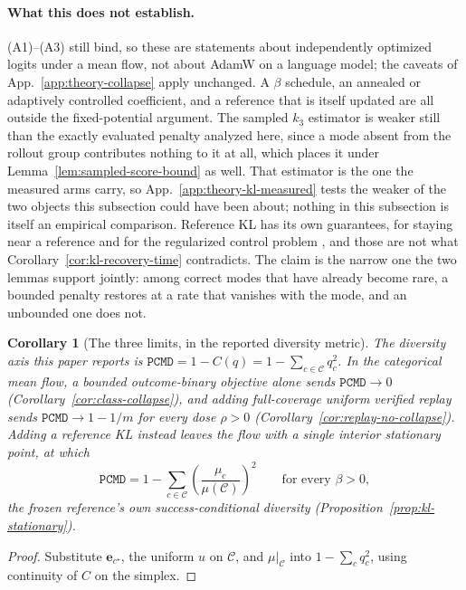 \documentclass{article}
\newcommand{\1}{\mathbf 1}
\newcommand{\pmd}{\texttt{PCMD}}
\newtheorem{corollary}[lemma]{Corollary}
\theoremstyle{remark}
\theoremstyle{definition}
\theoremstyle{plain}
\begin{document}
\paragraph{What this does not establish.} (A1)--(A3) still bind, so these are
statements about independently optimized logits under a mean flow, not about
AdamW on a language model; the caveats of
App.~\ref{app:theory-collapse} apply unchanged. A $\beta$ schedule, an
annealed or adaptively controlled coefficient, and a reference that is itself
updated are all outside the fixed-potential argument. The sampled $k_3$
estimator is weaker still than the exactly evaluated penalty analyzed here,
since a mode absent from the rollout group contributes nothing to it at all,
which places it under Lemma~\ref{lem:sampled-score-bound} as well. That
estimator is the one the measured arms carry, so
App.~\ref{app:theory-kl-measured} tests the weaker of the two objects this
subsection could have been about; nothing in this subsection is itself an
empirical comparison. Reference KL has its own guarantees, for staying near
a reference and for the regularized control problem
\citep{geist2019regmdp,vieillard2020kl}, and those are not what
Corollary~\ref{cor:kl-recovery-time} contradicts. The claim is the narrow one
the two lemmas support jointly: among correct modes that have already become
rare, a bounded penalty restores at a rate that vanishes with the mode, and an
unbounded one does not.

\begin{corollary}[The three limits, in the reported diversity metric]
\label{cor:pmd-limits}
The diversity axis this paper reports is
$\pmd{}=1-C(q)=1-\sum_{c\in\mathcal C}q_c^2$. In the categorical mean flow, a
bounded outcome-binary objective alone sends $\pmd{}\to0$
(Corollary~\ref{cor:class-collapse}), and adding full-coverage uniform verified
replay sends $\pmd{}\to1-1/m$ for every dose $\rho>0$
(Corollary~\ref{cor:replay-no-collapse}). Adding a reference KL instead leaves
the flow with a single interior stationary point, at which
\[
 \pmd{}=1-\sum_{c\in\mathcal C}
   \left(\frac{\mu_c}{\mu(\mathcal C)}\right)^{\!2}
 \qquad\text{for every }\beta>0,
\]
the frozen reference's own success-conditional diversity
(Proposition~\ref{prop:kl-stationary}).
\end{corollary}

\begin{proof}
Substitute $\mathbf e_{c^\star}$, the uniform $u$ on $\mathcal C$, and
$\mu|_{\mathcal C}$ into $1-\sum_cq_c^2$, using continuity of $C$ on the
simplex.
\end{proof}
\end{document}
